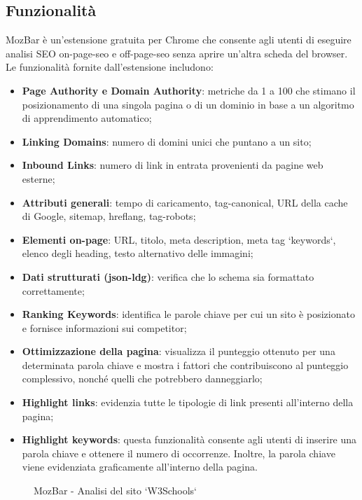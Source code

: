 \subsection{Funzionalità}
\par MozBar è un'estensione gratuita per Chrome che consente agli utenti di eseguire analisi SEO \gls{on-page-seo} e \gls{off-page-seo} senza aprire un'altra scheda del browser. Le funzionalità fornite dall'estensione includono:
\begin{itemize}
    \item \textbf{Page Authority e Domain Authority}: metriche da 1 a 100 che stimano il posizionamento di una singola pagina o di un dominio in base a un algoritmo di apprendimento automatico;
    \item \textbf{Linking Domains}: numero di domini unici che puntano a un sito;
    \item \textbf{Inbound Links}: numero di link in entrata provenienti da pagine web esterne;
    \item \textbf{Attributi generali}: tempo di caricamento, \gls{tag-canonical}, URL della cache di Google, \gls{sitemap}, \gls{hreflang}, \gls{tag-robots};
    \item \textbf{Elementi on-page}: URL, titolo, meta description, meta tag `keywords`, elenco degli heading, testo alternativo delle immagini;
    \item \textbf{Dati strutturati (\gls{json-ldg})}: verifica che lo schema sia formattato correttamente;
    \item \textbf{Ranking Keywords}: identifica le parole chiave per cui un sito è posizionato e fornisce informazioni sui competitor;
    \item \textbf{Ottimizzazione della pagina}: visualizza il punteggio ottenuto per una determinata parola chiave e mostra  i fattori che contribuiscono al punteggio complessivo, nonché quelli che potrebbero danneggiarlo;
    \item \textbf{Highlight links}: evidenzia tutte le tipologie di link presenti all'interno della pagina;
    \item \textbf{Highlight keywords}: questa funzionalità consente agli utenti di inserire una parola chiave e ottenere il numero di occorrenze. Inoltre, la parola chiave viene evidenziata graficamente all'interno della pagina.
\end{itemize}

\begin{figure}[H]
    \centering 
    \caption{MozBar - Analisi del sito `W3Schools`}
\end{figure}

